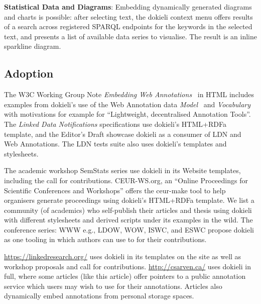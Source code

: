 \documentclass[a4paper]{llncs}
\begin{document}
                                    
\par \textbf{Statistical Data and Diagrams}: Embedding dynamically generated diagrams and charts is possible: after selecting text, the dokieli context menu offers results of a search across registered SPARQL endpoints for the keywords in the selected text, and presents a list of available data series to visualise. The result is an inline sparkline diagram.
                                
                            

                            
                                \subsection{Adoption}
  \label{adoption}

                                
                                    
\par The W3C Working Group Note \textit{Embedding Web Annotations}~\cite{ref-16} in HTML includes examples from dokieli’s use of the Web Annotation data \textit{Model}~\cite{ref-14} and \textit{Vocabulary}~\cite{ref-17} with motivations for example for ``Lightweight, decentralised Annotation Tools''.
                                    The \textit{Linked Data Notifications} specifications use dokieli’s HTML+RDFa template, and the \empty Editor’s Draft showcase dokieli as a consumer of LDN and Web Annotations. The LDN \empty tests suite also uses dokieli’s templates and stylesheets.

                                    
\par The academic workshop SemStats series use dokieli in its Website templates, including the call for contributions. CEUR-WS.org, an ``Online Proceedings for Scientific Conferences and Workshops'' offers the ceur-make tool to help organisers generate proceedings using dokieli’s HTML+RDFa template.
                                    We list a community (of academics) who self-publish their articles and thesis using dokieli with different stylesheets and derived scripts under its examples in the wild. The conference series: WWW e.g., LDOW, WOW, ISWC, and ESWC propose dokieli as one tooling in which authors can use to for their contributions.

                                    
\par \url{https://linkedresearch.org/} uses dokieli in its templates on the site as well as workshop proposals and call for contributions.
                                    \url{http://csarven.ca/} uses dokieli in full, where some articles (like this article) offer pointers to a public annotation service which users may wish to use for their annotations. Articles also dynamically embed annotations from personal storage spaces.
                                
\end{document}
